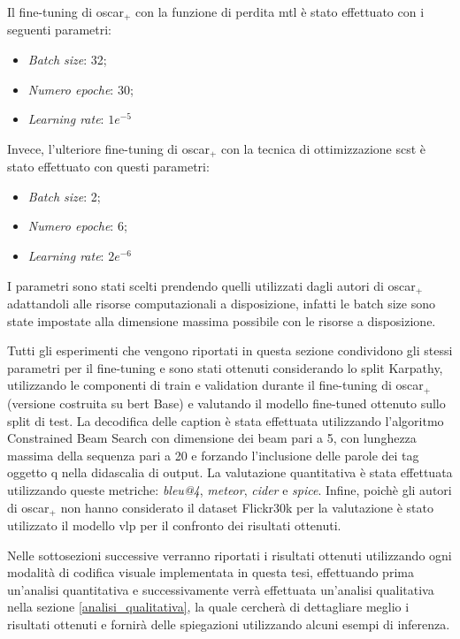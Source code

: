 Il fine-tuning di \acrshort{oscar}$_+$ con la funzione di perdita \acrshort{mtl} è stato effettuato con i seguenti parametri:
\begin{itemize}
    \item \textit{Batch size}: 32;
    \item \textit{Numero epoche}: 30;
    \item \textit{Learning rate}: $1e^{-5}$
\end{itemize}
Invece, l'ulteriore fine-tuning di \acrshort{oscar}$_+$ con la tecnica di ottimizzazione \acrshort{scst} è stato effettuato con questi parametri:
\begin{itemize}
    \item \textit{Batch size}: 2;
    \item \textit{Numero epoche}: 6;
    \item \textit{Learning rate}: $2e^{-6}$
\end{itemize}
I parametri sono stati scelti prendendo quelli utilizzati dagli autori di \acrshort{oscar}$_+$ adattandoli alle risorse computazionali a disposizione, infatti le batch size sono state impostate alla dimensione massima possibile con le risorse a disposizione.


Tutti gli esperimenti che vengono riportati in questa sezione condividono gli stessi parametri per il fine-tuning e sono stati ottenuti considerando lo split Karpathy, utilizzando le componenti di train e validation durante il fine-tuning di \acrshort{oscar}$_+$ (versione costruita su \acrshort{bert} Base) e valutando il modello fine-tuned ottenuto sullo split di test.
La decodifica delle caption è stata effettuata utilizzando l'algoritmo Constrained Beam Search con dimensione dei beam pari a 5, con lunghezza massima della sequenza pari a 20 e forzando l'inclusione delle parole dei tag oggetto q nella didascalia di output.
La valutazione quantitativa è stata effettuata utilizzando queste metriche: \textit{\acrshort{bleu}@4}, \textit{\acrshort{meteor}}, \textit{\acrshort{cider}} e \textit{\acrshort{spice}}.
Infine, poichè gli autori di \acrshort{oscar}$_+$ non hanno considerato il dataset Flickr30k per la valutazione è stato utilizzato il modello \acrshort{vlp} per il confronto dei risultati ottenuti.


Nelle sottosezioni successive verranno riportati i risultati ottenuti utilizzando ogni modalità di codifica visuale implementata in questa tesi, effettuando prima un'analisi quantitativa e successivamente verrà effettuata un'analisi qualitativa nella sezione \ref{analisi_qualitativa}, la quale cercherà di dettagliare meglio i risultati ottenuti e fornirà delle spiegazioni utilizzando alcuni esempi di inferenza.



